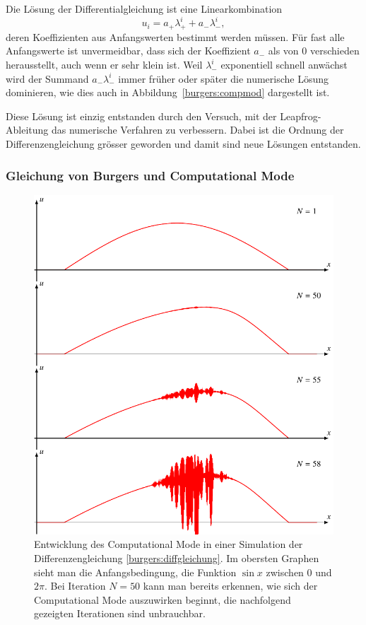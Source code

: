 Die Lösung der Differentialgleichung ist eine Linearkombination
\[
u_i = a_+\lambda_+^i + a_-\lambda_-^i,
\]
deren Koeffizienten aus Anfangswerten bestimmt werden müssen.
Für fast alle Anfangswerte ist unvermeidbar, dass sich der
Koeffizient $a_-$ als von $0$ verschieden herausstellt, auch
wenn er sehr klein ist.
Weil $\lambda_-^i$ exponentiell schnell anwächst wird der Summand
$a_-\lambda_-^i$ immer früher oder später die numerische Lösung dominieren,
wie dies auch in Abbildung~\ref{burgers:compmod} dargestellt ist.

Diese Lösung ist einzig entstanden durch den Versuch, mit der
Leapfrog-Ableitung das numerische Verfahren zu verbessern.
Dabei ist die Ordnung der Differenzengleichung grösser geworden und damit
sind neue Lösungen entstanden.

\subsubsection{Gleichung von Burgers und Computational Mode}
\begin{figure}
\centering
\includegraphics{learning/burgerwave.pdf}
\caption{Entwicklung des Computational Mode in einer Simulation
der Differenzengleichung \eqref{burgers:diffgleichung}.
Im obersten Graphen sieht man die Anfangsbedingung, die Funktion $\sin x$
zwischen $0$ und $2\pi$.
Bei Iteration $N=50$ kann man bereits erkennen, wie sich der Computational
Mode auszuwirken beginnt, die nachfolgend gezeigten Iterationen sind
unbrauchbar.
\label{burgers:burgerwave}}
\end{figure}
